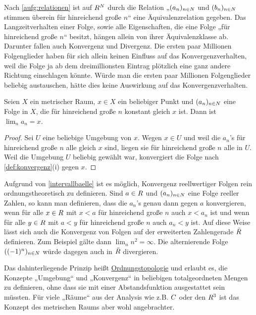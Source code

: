 \begin{bem}
    Nach \cref{aufg:relationen} ist auf $\relax R^\relax N$ durch die Relation „$(a_n)_{n\in \relax N}$ und $(b_n)_{n\in \relax N}$ stimmen überein für hinreichend große $n$“ eine Äquivalenzrelation gegeben. Das Langzeitverhalten einer Folge, sowie alle Eigenschaften, die eine Folge „für hinreichend große $n$“ besitzt, hängen allein von ihrer Äquivalenzklasse ab. Darunter fallen auch Konvergenz und Divergenz. Die ersten paar Millionen Folgenglieder haben für sich allein keinen Einfluss auf das Konvergenzverhalten, weil die Folge ja ab dem dreimillionsten Eintrag plötzlich eine ganz andere Richtung einschlagen könnte. Würde man die ersten paar Millionen Folgenglieder beliebig austauschen, hätte dies keine Auswirkung auf das Konvergenzverhalten.
\end{bem}


\begin{bsp}
    Seien $X$ ein metrischer Raum, $x \in X$ ein beliebiger Punkt und $(a_n)_{n\in \relax N}$ eine Folge in $X$, die für hinreichend große $n$ konstant gleich $x$ ist. Dann ist $\lim_n a_n=x$.
\end{bsp}
\begin{proof}
    Sei $U$ eine beliebige Umgebung von $x$. Wegen $x\in U$ und weil die $a_n$'s für hinreichend große $n$ alle gleich $x$ sind, liegen sie für hinreichend große $n$ alle in $U$. Weil die Umgebung $U$ beliebig gewählt war, konvergiert die Folge nach \cref{def:konvergenz}(i) gegen $x$.
\end{proof}


\begin{vorschau}[* Ordnungstopologie]
    Aufgrund von \cref{intervallbaelle} ist es möglich, Konvergenz reellwertiger Folgen rein ordnungstheoretisch zu definieren. Sind $a\in \relax R$ und $(a_n)_{n\in \relax N}$ eine Folge reeller Zahlen, so kann man definieren, dass die $a_n$'s genau dann gegen $a$ konvergieren, wenn für alle $x\in \relax R$ mit $x<a$ für hinreichend große $n$ auch $x<a_n$ ist und wenn für alle $y\in \relax R$ mit $a<y$ für hinreichend große $n$ auch $a_n<y$ ist. Auf diese Weise lässt sich auch die Konvergenz von Folgen auf der erweiterten Zahlengerade $\bar {\relax R}$ definieren. Zum Beispiel gälte dann $\lim_n n^2=\infty$. Die alternierende Folge $((-1)^n)_{n\in \relax N}$ würde dagegen auch in $\bar{\relax R}$ divergieren.
    
    Das dahinterliegende Prinzip heißt \href{https://de.wikipedia.org/wiki/Ordnungstopologie}{Ordnungstopologie} und erlaubt es, die Konzepte „Umgebung“ und „Konvergenz“ in beliebigen totalgeordneten Mengen zu definieren, ohne dass sie mit einer Abstandsfunktion ausgestattet sein müssten. Für viele „Räume“ aus der Analysis wie z.B. $\relax C$ oder den $\relax R^3$ ist das Konzept des metrischen Raums aber wohl angebrachter.
\end{vorschau}





